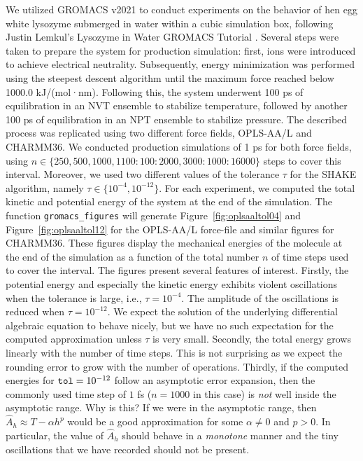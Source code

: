 \documentclass[runningheads]{llncs}
\begin{document}
We utilized GROMACS v2021 to conduct experiments on the behavior of hen egg white lysozyme submerged in water within a cubic simulation box, following Justin Lemkul's Lysozyme in Water GROMACS Tutorial \cite{lemkul2019from}. Several steps were taken to prepare the system for production simulation: first, ions were introduced to achieve electrical neutrality. Subsequently, energy minimization was performed using the steepest descent algorithm until the maximum force reached below 1000.0 kJ/(mol·nm). Following this, the system underwent 100 ps of equilibration in an NVT ensemble to stabilize temperature, followed by another 100 ps of equilibration in an NPT ensemble to stabilize pressure. The described process was replicated using two different force fields, OPLS-AA/L and CHARMM36. We conducted production simulations of 1 ps for both force fields, using $n \in \{250, 500, 1000, 1100:100:2000, 3000:1000:16000 \}$ steps to cover this interval.
Moreover, we used two different values of the tolerance $\tau$ for the SHAKE algorithm, namely $\tau \in \{10^{-4}, 10^{-12}\}$. 
For each experiment, we computed the total kinetic and potential energy of the system at the end of the simulation.
The function {\tt gromacs\_figures} will generate Figure~\ref{fig:oplsaaltol04} and Figure~\ref{fig:oplsaaltol12} for the OPLS-AA/L force-file and similar figures for CHARMM36. These figures display the mechanical energies of the molecule at the end of the simulation as a function of the total number $n$ of time steps used to cover the interval. The figures present several features of interest.
Firstly, the potential energy and especially the kinetic energy exhibits violent oscillations when the tolerance is large, i.e., $\tau = 10^{-4}$. The amplitude of the oscillations is reduced when $\tau = 10^{-12}$. We expect the solution of the underlying differential algebraic equation to behave nicely, but we have no such expectation for the computed approximation unless $\tau$ is very small. 
Secondly, the total energy grows linearly with the number of time steps. This is not surprising as we expect the rounding error to grow with the number of operations.
Thirdly, if the computed energies for ${\tt tol} = 10 ^{-12}$ follow an asymptotic error expansion, then the commonly used time step of $1$ fs ($n=1000$ in this case) is \emph{not} well inside the asymptotic range. Why is this? If we were in the asymptotic range, then $\hat{A}_h \approx T - \alpha h^p$ would be a good approximation for some $\alpha \not = 0$ and $p>0$. In particular, the value of $\hat{A}_h$ should behave in a \emph{monotone} manner and the tiny oscillations that we have recorded should not be present.
\end{document}
